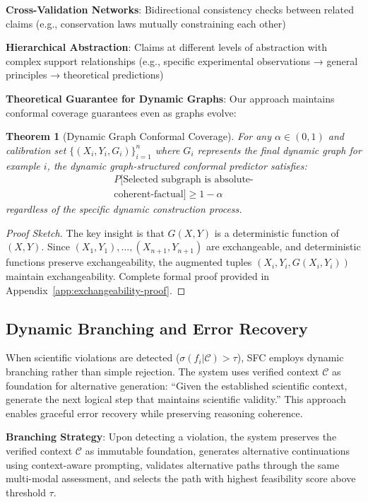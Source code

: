 \documentclass{uai2026} %
\theoremstyle{remark}
\theoremstyle{plain}
\newtheorem{theorem}{Theorem} %
\theoremstyle{definition}
\begin{document}
\textbf{Cross-Validation Networks}: Bidirectional consistency checks between related claims (e.g., conservation laws mutually constraining each other)

\textbf{Hierarchical Abstraction}: Claims at different levels of abstraction with complex support relationships (e.g., specific experimental observations → general principles → theoretical predictions)

\textbf{Theoretical Guarantee for Dynamic Graphs}: Our approach maintains conformal coverage guarantees even as graphs evolve:

\begin{theorem}[Dynamic Graph Conformal Coverage]
\label{thm:dynamic-coverage}
For any $\alpha \in (0,1)$ and calibration set $\{(X_i, Y_i, G_i)\}_{i=1}^n$ where $G_i$ represents the final dynamic graph for example $i$, the dynamic graph-structured conformal predictor satisfies:
\begin{align}
P[\text{Selected subgraph is absolute-}\nonumber\\
\text{coherent-factual}] \geq 1-\alpha
\end{align}
regardless of the specific dynamic construction process.
\end{theorem}

\begin{proof}[Proof Sketch]
The key insight is that $G(X,Y)$ is a deterministic function of $(X,Y)$. Since $(X_1,Y_1),\ldots,(X_{n+1},Y_{n+1})$ are exchangeable, and deterministic functions preserve exchangeability, the augmented tuples $(X_i,Y_i,G(X_i,Y_i))$ maintain exchangeability. Complete formal proof provided in Appendix~\ref{app:exchangeability-proof}.
\end{proof}
\subsection{Dynamic Branching and Error Recovery}

When scientific violations are detected ($\sigma(f_i | \mathcal{C}) > \tau$), SFC employs dynamic branching rather than simple rejection. The system uses verified context $\mathcal{C}$ as foundation for alternative generation: ``Given the established scientific context, generate the next logical step that maintains scientific validity.'' This approach enables graceful error recovery while preserving reasoning coherence.

\textbf{Branching Strategy}: Upon detecting a violation, the system preserves the verified context $\mathcal{C}$ as immutable foundation, generates alternative continuations using context-aware prompting, validates alternative paths through the same multi-modal assessment, and selects the path with highest feasibility score above threshold $\tau$.
\end{document}
